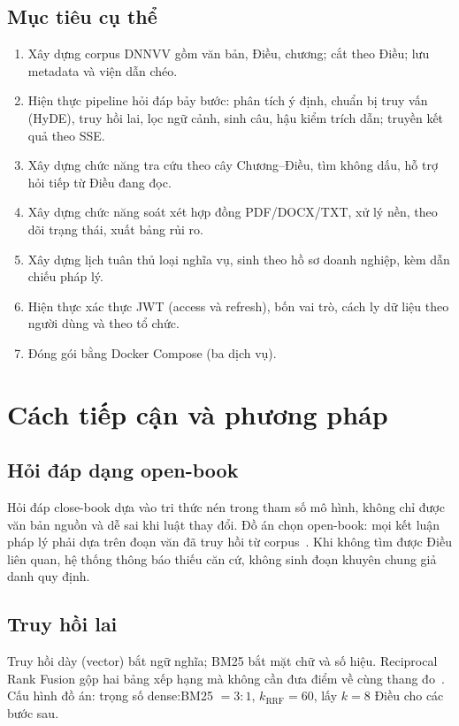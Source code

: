\subsection{Mục tiêu cụ thể}

\begin{enumerate}
    \item Xây dựng corpus DNNVV gồm \soLuat{} văn bản, \soDieu{} Điều,
    \soChuong{} chương; cắt theo Điều; lưu metadata và viện dẫn chéo.
    \item Hiện thực pipeline hỏi đáp bảy bước: phân tích ý định, chuẩn bị truy
    vấn (HyDE), truy hồi lai, lọc ngữ cảnh, sinh câu, hậu kiểm trích dẫn; truyền
    kết quả theo SSE.
    \item Xây dựng chức năng tra cứu theo cây Chương--Điều, tìm không dấu, hỗ trợ
    hỏi tiếp từ Điều đang đọc.
    \item Xây dựng chức năng soát xét hợp đồng PDF/DOCX/TXT, xử lý nền, theo dõi
    trạng thái, xuất bảng rủi ro.
    \item Xây dựng lịch tuân thủ \soRule{} loại nghĩa vụ, sinh theo hồ sơ doanh
    nghiệp, kèm dẫn chiếu pháp lý.
    \item Hiện thực xác thực JWT (access và refresh), bốn vai trò, cách ly dữ
    liệu theo người dùng và theo tổ chức.
    \item Đóng gói bằng Docker Compose (ba dịch vụ).
\end{enumerate}

\section{Cách tiếp cận và phương pháp}

\subsection{Hỏi đáp dạng open-book}

Hỏi đáp close-book dựa vào tri thức nén trong tham số mô hình, không chỉ được
văn bản nguồn và dễ sai khi luật thay đổi. Đồ án chọn open-book: mọi kết luận
pháp lý phải dựa trên đoạn văn đã truy hồi từ corpus~\cite{lewis2020rag}. Khi
không tìm được Điều liên quan, hệ thống thông báo thiếu căn cứ, không sinh đoạn
khuyên chung giả danh quy định.

\subsection{Truy hồi lai}

Truy hồi dày (vector) bắt ngữ nghĩa; BM25 bắt mặt chữ và số hiệu. Reciprocal Rank
Fusion gộp hai bảng xếp hạng mà không cần đưa điểm về cùng thang
đo~\cite{cormack2009rrf}. Cấu hình đồ án: trọng số dense:BM25 $= 3:1$,
$k_{\mathrm{RRF}}=60$, lấy $k=8$ Điều cho các bước sau.

